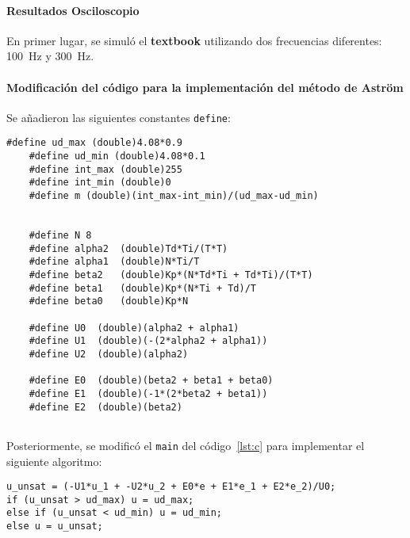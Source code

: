 \paragraph{Resultados Osciloscopio}
En primer lugar, se simuló el \textbf{textbook} utilizando dos frecuencias diferentes: \SI{100}{\hertz} y \SI{300}{\hertz}.



\onecolumn
\paragraph{Modificación del código para la implementación del método de Astr\"om}
Se añadieron las siguientes constantes \texttt{define}: \hfill \break

\begin{lstlisting}[style=cstyle,caption={Definiciones adicionales para implementar Astr\"om},label={lst:c1}]
	#define ud_max (double)4.08*0.9
	#define ud_min (double)4.08*0.1
	#define int_max (double)255
	#define int_min (double)0
	#define m (double)(int_max-int_min)/(ud_max-ud_min)
	
	
	#define N 8
	#define alpha2  (double)Td*Ti/(T*T)
	#define alpha1  (double)N*Ti/T
	#define beta2   (double)Kp*(N*Td*Ti + Td*Ti)/(T*T)
	#define beta1   (double)Kp*(N*Ti + Td)/T
	#define beta0   (double)Kp*N
	
	#define U0  (double)(alpha2 + alpha1)
	#define U1  (double)(-(2*alpha2 + alpha1))
	#define U2  (double)(alpha2)
	
	#define E0  (double)(beta2 + beta1 + beta0)
	#define E1  (double)(-1*(2*beta2 + beta1))
	#define E2  (double)(beta2)
	
\end{lstlisting}

Posteriormente, se modificó el \texttt{main} del código~\ref{lst:c} para implementar el siguiente algoritmo:

\begin{lstlisting}[style=cstyle,caption={Implementación del algoritmo de Aström con saturación},label={lst:c1}]
u_unsat = (-U1*u_1 + -U2*u_2 + E0*e + E1*e_1 + E2*e_2)/U0;
if (u_unsat > ud_max) u = ud_max;
else if (u_unsat < ud_min) u = ud_min;
else u = u_unsat;

\end{lstlisting}

\twocolumn
{}
